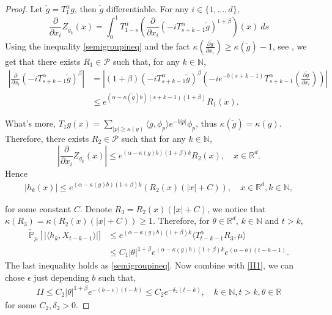 \documentclass{article}
\begin{document}
\begin{proof}
    Let $\tilde{g}=T_1^{\alpha}g $, then $\tilde{g}$ differentiable. For any $i \in \{1,...,d\}$,
    $$\frac{\partial}{\partial x_i}Z_{g_k}(x)=\int_0^1 T^{\alpha}_{1-s}\left(\frac{\partial}{\partial x_i}(-i T_{s+k-1}^{\alpha} \tilde{g})^{1+\beta}\right)(x)~ds$$
    Using the inequality \eqref{semigroupineq} and the fact $\kappa\left(\frac{\partial \tilde{g}}{\partial x_i}\right)\geq \kappa(\tilde{g})-1$, see \cite[Lemma 2.3]{RSZ}, we get that there exists $R_1 \in \mathcal{P}$ such that, for any $k\in \mathbb{N}$,
    \begin{align*}
        \left|\frac{\partial}{\partial x_i}(-i T_{s+k-1}^{\alpha}\tilde{g})^{\beta}\right|&=\left|(1+\beta)(-i T_{s+k-1}^{\alpha}\tilde{g})^{\beta}(-i e^{-b(s+k-1)}T_{s+k-1}^{\alpha}\left(\frac{\partial \tilde{g}}{\partial x_i}\right))\right|\\
        &\leq e^{(\alpha-\kappa(\tilde{g})b)(s+k-1)(1+\beta)}R_1(x).
    \end{align*}
    
    What's more, $T_1 g(x)=\sum_{|p|\geq\kappa(g)}\langle g,\phi_p\rangle e^{-b|p|}\phi_p$, thus $\kappa(\tilde{g})=\kappa(g)$. Therefore, there exists $R_2 \in \mathcal{P}$ such that for any $k\in \mathbb{N}$,
    $$\left|\frac{\partial}{\partial x_i}Z_{g_k}(x)\right|\leq e^{(\alpha-\kappa(g)b)(1+\beta)k}R_2(x),\quad x\in \mathbb{R}^d. $$
    Hence
\begin{align}
    |h_k(x)|\leq e^{(\alpha-\kappa(g)b)(1+\beta)k}(R_2(x)(|x|+C)),\quad  x\in \mathbb{R}^d, k\in\mathbb{N},
\end{align}

for some constant $C$. Denote $R_3=R_2(x)(|x|+C)$, we notice that $\kappa(R_3)=\kappa(R_2(x)(|x|+C))\geq1$. Therefore, for $\theta\in \mathbb{R}^d$, $k\in\mathbb{N}$ and $t>k$,
\begin{align*}
  \mathbb{\tilde{P}}_{\mu}\left[|\langle h_k,X_{t-k-1}\rangle\right|]&\leq e^{(\alpha-\kappa(g)b)(1+\beta)k}\langle T_{t-k-1}^{\alpha}R_3,\mu\rangle\\
  &\leq C_1|\theta|^{1+\beta} e^{(\alpha-\kappa(g)b)(1+\beta)k}e^{(\alpha-b)(t-k-1)}.
\end{align*}
 The last inequality holds as \eqref{semigroupineq}. Now combine with \eqref{II1}, we can chose $\epsilon$ just depending $b$ such that, 
\begin{align}
    II\leq C_2|\theta|^{1+\beta} e^{-(b-\epsilon)(t-k)}\leq C_2e^{-\delta_2(t-k)},\quad k\in\mathbb{N},t>k,\theta\in\mathbb{R}\label{lemma32q}
\end{align}
for some $C_2,\delta_2>0$.


\end{proof}
\end{document}
